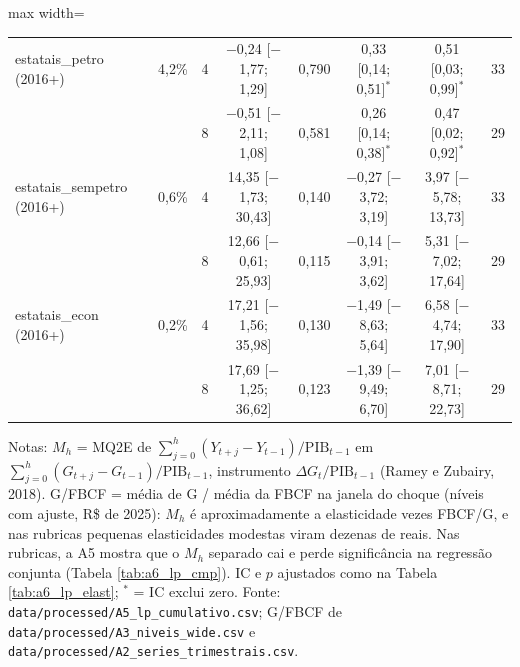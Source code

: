 \begin{table}[htbp]
\begin{adjustbox}{max width=\linewidth}
\begin{tabular}{lccccccc}
estatais\_petro (2016+) & 4{,}2\% & 4 & $-$0{,}24 [$-$1{,}77; 1{,}29] & 0{,}790 & 0{,}33 [0{,}14; 0{,}51]$^{*}$ & 0{,}51 [0{,}03; 0{,}99]$^{*}$ & 33 \\
 &  & 8 & $-$0{,}51 [$-$2{,}11; 1{,}08] & 0{,}581 & 0{,}26 [0{,}14; 0{,}38]$^{*}$ & 0{,}47 [0{,}02; 0{,}92]$^{*}$ & 29 \\
estatais\_sempetro (2016+) & 0{,}6\% & 4 & 14{,}35 [$-$1{,}73; 30{,}43] & 0{,}140 & $-$0{,}27 [$-$3{,}72; 3{,}19] & 3{,}97 [$-$5{,}78; 13{,}73] & 33 \\
 &  & 8 & 12{,}66 [$-$0{,}61; 25{,}93] & 0{,}115 & $-$0{,}14 [$-$3{,}91; 3{,}62] & 5{,}31 [$-$7{,}02; 17{,}64] & 29 \\
estatais\_econ (2016+) & 0{,}2\% & 4 & 17{,}21 [$-$1{,}56; 35{,}98] & 0{,}130 & $-$1{,}49 [$-$8{,}63; 5{,}64] & 6{,}58 [$-$4{,}74; 17{,}90] & 33 \\
 &  & 8 & 17{,}69 [$-$1{,}25; 36{,}62] & 0{,}123 & $-$1{,}39 [$-$9{,}49; 6{,}70] & 7{,}01 [$-$8{,}71; 22{,}73] & 29 \\
\bottomrule
\end{tabular}
\end{adjustbox}
\begin{minipage}{0.97\linewidth}\footnotesize
\medskip Notas: $M_h$ = MQ2E de $\sum_{j=0}^{h}(Y_{t+j}-Y_{t-1})/\mathrm{PIB}_{t-1}$ em $\sum_{j=0}^{h}(G_{t+j}-G_{t-1})/\mathrm{PIB}_{t-1}$, instrumento $\Delta G_t/\mathrm{PIB}_{t-1}$ (Ramey e Zubairy, 2018). G/FBCF = m\'edia de G / m\'edia da FBCF na janela do choque (n\'iveis com ajuste, R\$ de 2025): $M_h$ \'e aproximadamente a elasticidade vezes FBCF/G, e nas rubricas pequenas elasticidades modestas viram dezenas de reais. Nas rubricas, a A5 mostra que o $M_h$ separado cai e perde signific\^ancia na regress\~ao conjunta (Tabela \ref{tab:a6_lp_cmp}). IC e $p$ ajustados como na Tabela \ref{tab:a6_lp_elast}; $^{*}$ = IC exclui zero. Fonte: \texttt{data/processed/A5\_lp\_cumulativo.csv}; G/FBCF de \texttt{data/processed/A3\_niveis\_wide.csv} e \texttt{data/processed/A2\_series\_trimestrais.csv}.
\end{minipage}
\end{table}

